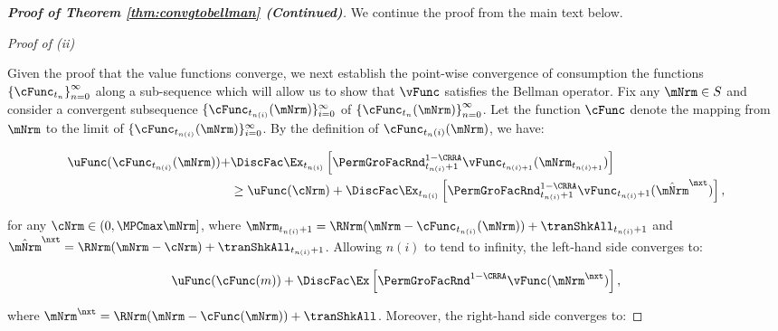 \documentclass[\econtexRoot/BufferStockTheory]{subfiles}
\begin{document}
\begin{proof}[{\textbf{Proof of Theorem \ref{thm:convgtobellman} (Continued)}}]

We continue the proof from the main text below. 

\vspace{0.7em} %
\noindent\textit{Proof of (ii)}  %
\vspace{0.7em} %

Given the proof that the value functions converge, we next establish the point-wise convergence of consumption the functions $\left\{ \cFunc_{t_{n}}\right\}_{n=0}^{\infty}$ along a sub-sequence which will allow us to show that $\vFunc$ satisfies the Bellman operator. Fix any $\mNrm\in S$ and consider a convergent subsequence $\{\cFunc_{t_{n(i)}}(\mNrm)\}_{i=0}^{\infty}$ of $\left\{ \cFunc_{t_{n}}(\mNrm) \right\}_{n=0}^{\infty}$. Let the function $\cFunc$ denote the mapping from $\mNrm$ to the limit of $\{\cFunc_{t_{n(i)}}(\mNrm)\}_{i=0}^{\infty}$. By the definition of $\cFunc_{t_n(i)}(\mNrm)$, we have:

\begin{samepage}
\begin{equation}
\begin{split}
\uFunc(\cFunc_{t_{n(i)}}(\mNrm)) + & \DiscFac \Ex_{t_{n(i)}} \left[ {\PermGroFacRnd}_{t_{n(i)}+1}^{1 - \CRRA} \vFunc_{t_{n(i)+1}}(\mNrm_{t_{n(i)+1}}) \right] \\ 
& \geq \uFunc(\cNrm) + \DiscFac \Ex_{t_{n(i)}} \left[ {\PermGroFacRnd}_{t_{n(i)}+1}^{1 - \CRRA} \vFunc_{t_{n(i)}+1}(\hat{\mNrm}^{\nxt}) \right], 
\end{split}
\end{equation}
\end{samepage}

for any $\cNrm \in (0, \MPCmax \mNrm]$, where $\mNrm_{t_{n(i)}+1} = \RNrm(\mNrm - \cFunc_{t_{n(i)}}(\mNrm)) + \tranShkAll_{t_{n(i)}+1}$ and $\hat{\mNrm}^{\nxt} = \RNrm(\mNrm - \cNrm) + \tranShkAll_{t_{n(i)}+1}$. Allowing $n(i)$ to tend to infinity, the left-hand side converges to:
 
\begin{equation}
\uFunc(\cFunc(m)) + \DiscFac \Ex \left[ {\PermGroFacRnd}^{1 - \CRRA} \vFunc(\mNrm^{\nxt}) \right],
\end{equation}

where $\mNrm^{\nxt} = \RNrm(\mNrm - \cFunc(\mNrm)) + \tranShkAll$. Moreover, the right-hand side converges to:


\end{proof}
\end{document}
